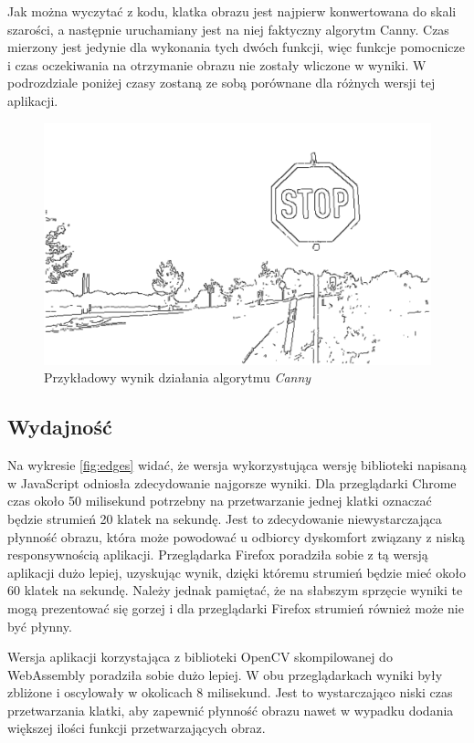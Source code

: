 \documentclass[language=polish,type=master]{aghmodern}
\begin{document}
Jak można wyczytać z kodu, klatka obrazu jest najpierw konwertowana do skali szarości, a następnie uruchamiany jest na niej faktyczny algorytm Canny.
Czas mierzony jest jedynie dla wykonania tych dwóch funkcji, więc funkcje pomocnicze i czas oczekiwania na otrzymanie obrazu nie zostały wliczone w wyniki.
W podrozdziale poniżej czasy zostaną ze sobą porównane dla różnych wersji tej aplikacji.

\begin{figure}[H]
    \centering
    \includegraphics[width=\textwidth]{images/edges.pdf}
    \vspace*{10pt}
    \caption{Przykładowy wynik działania algorytmu \emph{Canny}}
    \label{fig:edges_example}
\end{figure}

\subsection{Wydajność}
Na wykresie \ref{fig:edges} widać, że wersja wykorzystująca wersję biblioteki napisaną w JavaScript odniosła zdecydowanie najgorsze wyniki.
Dla przeglądarki Chrome czas około 50 milisekund potrzebny na przetwarzanie jednej klatki oznaczać będzie strumień 20 klatek na sekundę.
Jest to zdecydowanie niewystarczająca płynność obrazu, która może powodować u odbiorcy dyskomfort związany z niską responsywnością aplikacji.
Przeglądarka Firefox poradziła sobie z tą wersją aplikacji dużo lepiej, uzyskując wynik, dzięki któremu strumień będzie mieć około 60 klatek na sekundę.
Należy jednak pamiętać, że na słabszym sprzęcie wyniki te mogą prezentować się gorzej i dla przeglądarki Firefox strumień również może nie być płynny.

Wersja aplikacji korzystająca z biblioteki OpenCV skompilowanej do WebAssembly poradziła sobie dużo lepiej.
W obu przeglądarkach wyniki były zbliżone i oscylowały w okolicach 8 milisekund.
Jest to wystarczająco niski czas przetwarzania klatki, aby zapewnić płynność obrazu nawet w wypadku dodania większej ilości funkcji przetwarzających obraz.
\end{document}

